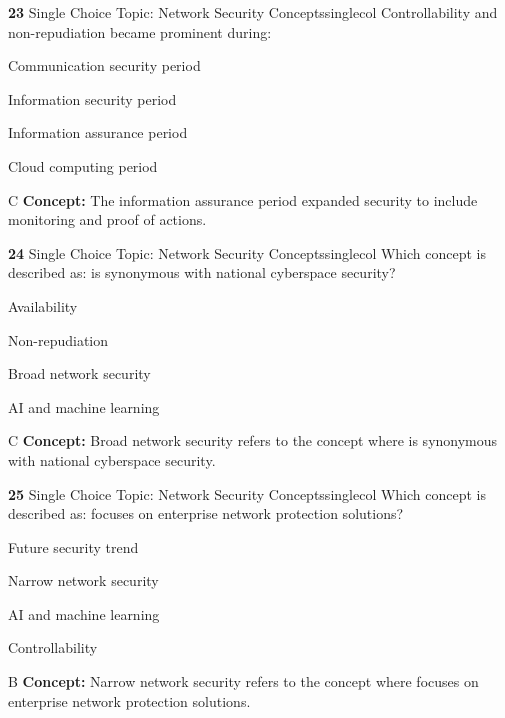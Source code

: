 \documentclass[10pt,a4paper]{article}
\begin{document}
\begin{qcard}{\color{white}\textbf{23} \hfill \small Single Choice \textbar{} Topic: Network Security Concepts}{singlecol}
Controllability and non-repudiation became prominent during:

\begin{qoptions}
\item Communication security period
\item Information security period
\item Information assurance period
\item Cloud computing period
\end{qoptions}
\begin{explainbox}{C}
\textbf{Concept:} The information assurance period expanded security to include monitoring and proof of actions.
\end{explainbox}
\end{qcard}

\begin{qcard}{\color{white}\textbf{24} \hfill \small Single Choice \textbar{} Topic: Network Security Concepts}{singlecol}
Which concept is described as: is synonymous with national cyberspace security?

\begin{qoptions}
\item Availability
\item Non-repudiation
\item Broad network security
\item AI and machine learning
\end{qoptions}
\begin{explainbox}{C}
\textbf{Concept:} Broad network security refers to the concept where is synonymous with national cyberspace security.
\end{explainbox}
\end{qcard}

\begin{qcard}{\color{white}\textbf{25} \hfill \small Single Choice \textbar{} Topic: Network Security Concepts}{singlecol}
Which concept is described as: focuses on enterprise network protection solutions?

\begin{qoptions}
\item Future security trend
\item Narrow network security
\item AI and machine learning
\item Controllability
\end{qoptions}
\begin{explainbox}{B}
\textbf{Concept:} Narrow network security refers to the concept where focuses on enterprise network protection solutions.
\end{explainbox}
\end{qcard}
\end{document}
